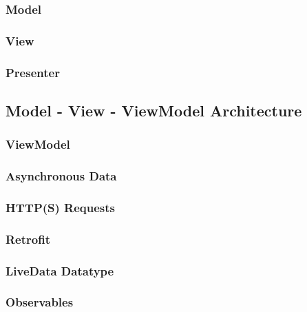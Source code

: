 \subsubsection{Model}
\subsubsection{View}
\subsubsection{Presenter}
\subsection{Model - View - ViewModel Architecture}
\subsubsection{ViewModel}
\subsubsection{Asynchronous Data}
\subsubsection{HTTP(S) Requests}
\subsubsection{Retrofit}
\subsubsection{LiveData Datatype}
\subsubsection{Observables}
